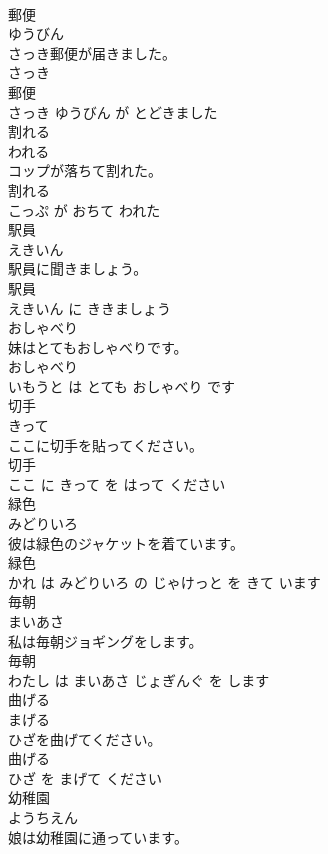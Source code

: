 \documentclass[8pt]{extreport}
\begin{document}
\begin{CJK}{UTF8}{min}
\\	郵便	
\\	ゆうびん			
\\	さっき郵便が届きました。	
\\	さっき 
\\	郵便 
\\	さっき ゆうびん が とどきました			
\\	割れる	
\\	われる			
\\	コップが落ちて割れた。	
\\	割れる 
\\	こっぷ が おちて われた			
\\	駅員	
\\	えきいん			
\\	駅員に聞きましょう。	
\\	駅員 
\\	えきいん に ききましょう			
\\	おしゃべり	
\\	妹はとてもおしゃべりです。	
\\	おしゃべり 
\\	いもうと は とても おしゃべり です			
\\	切手	
\\	きって			
\\	ここに切手を貼ってください。	
\\	切手 
\\	ここ に きって を はって ください			
\\	緑色	
\\	みどりいろ			
\\	彼は緑色のジャケットを着ています。	
\\	緑色 
\\	かれ は みどりいろ の じゃけっと を きて います			
\\	毎朝	
\\	まいあさ			
\\	私は毎朝ジョギングをします。	
\\	毎朝 
\\	わたし は まいあさ じょぎんぐ を します			
\\	曲げる	
\\	まげる			
\\	ひざを曲げてください。	
\\	曲げる 
\\	ひざ を まげて ください			
\\	幼稚園	
\\	ようちえん			
\\	娘は幼稚園に通っています。	

\end{CJK}
\end{document}
